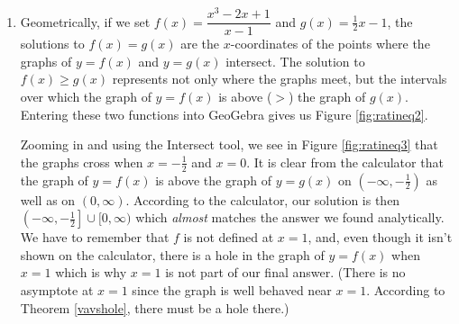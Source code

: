 {\begin{enumerate}
\medskip

Viewing the left hand side as a rational function $r(x)$ we make a sign diagram.  The only value excluded from the domain of $r$ is $x=1$ which is the solution to $2x-2=0$.  The zeros of $r$ are the solutions to $2x^3-x^2-x=0$, which we have already found to be $x=0$, $x=-\frac{1}{2}$ and $x=1$, the latter was discounted as a zero because it is not in the domain.  Choosing test values in each test interval, we obtain the sign diagram in Figure \ref{fig:ratineq1}. 


We are interested in where $r(x) \geq 0$.  We find $r(x) > 0$, or $(+)$, on the intervals $\left(-\infty, -\frac{1}{2}\right)$, $(0,1)$ and $(1, \infty)$.  We add to these intervals the zeros of $r$, $-\frac{1}{2}$ and $0$, to get our final solution:  $\left( - \infty, -\frac{1}{2} \right] \cup [0,1) \cup (1, \infty)$.

\item  Geometrically, if we set $f(x) = \dfrac{x^3-2x+1}{x-1}$ and $g(x) = \frac{1}{2} x -1$, the solutions to $f(x)=g(x)$ are the $x$-coordinates of the points where the graphs of $y=f(x)$ and $y=g(x)$ intersect.  The solution to $f(x) \geq g(x)$ represents not only where the graphs meet, but the intervals over which the graph of $y=f(x)$ is above ($>$) the graph of $g(x)$. Entering these two functions into GeoGebra gives us Figure \ref{fig:ratineq2}. 



Zooming in and using the Intersect tool, we see in Figure \ref{fig:ratineq3} that the graphs cross when $x=-\frac{1}{2}$ and $x=0$.  It is clear from the calculator that the graph of $y=f(x)$ is above the graph of $y=g(x)$ on $\left(-\infty, -\frac{1}{2}\right)$ as well as on $(0,\infty)$.  According to the calculator, our solution is then $\left(-\infty, -\frac{1}{2}\right] \cup [0, \infty)$ which \textit{almost} matches the answer we found analytically.  We have to remember that $f$ is not defined at $x=1$, and, even though it isn't shown on the calculator, there is a hole in the graph of $y=f(x)$ when $x=1$ which is why $x=1$ is not part of our final answer. (There is no asymptote at $x=1$ since the graph is well behaved near $x=1$.  According to Theorem \ref{vavshole}, there  must be a hole there.)

\end{enumerate}
}  

